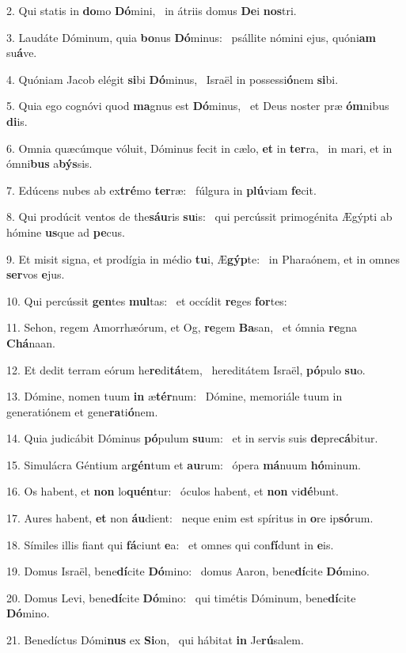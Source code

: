 2. Qui statis in \textbf{do}mo \textbf{Dó}mini, \ast\  in átriis domus \textbf{De}i \textbf{nos}tri.\

3. Laudáte Dóminum, quia \textbf{bo}nus \textbf{Dó}minus: \ast\  psállite nómini ejus, quóni\textbf{am} su\textbf{á}ve.\

4. Quóniam Jacob elégit \textbf{si}bi \textbf{Dó}minus, \ast\  Israël in possessi\textbf{ó}nem \textbf{si}bi.\

5. Quia ego cognóvi quod \textbf{ma}gnus est \textbf{Dó}minus, \ast\  et Deus noster præ \textbf{óm}nibus \textbf{di}is.\

6. Omnia quæcúmque vóluit, Dóminus fecit in cælo, \textbf{et} in \textbf{ter}ra, \ast\  in mari, et in ómni\textbf{bus} a\textbf{býs}sis.\

7. Edúcens nubes ab ex\textbf{tré}mo \textbf{ter}ræ: \ast\  fúlgura in \textbf{plú}viam \textbf{fe}cit.\

8. Qui prodúcit ventos de the\textbf{sáu}ris \textbf{su}is: \ast\  qui percússit primogénita Ægýpti ab hómine \textbf{us}que ad \textbf{pe}cus.\

9. Et misit signa, et prodígia in médio \textbf{tu}i, Æ\textbf{gýp}te: \ast\  in Pharaónem, et in omnes \textbf{ser}vos \textbf{e}jus.\

10. Qui percússit \textbf{gen}tes \textbf{mul}tas: \ast\  et occídit \textbf{re}ges \textbf{for}tes:\

11. Sehon, regem Amorrhæórum, et Og, \textbf{re}gem \textbf{Ba}san, \ast\  et ómnia \textbf{re}gna \textbf{Chá}naan.\

12. Et dedit terram eórum he\textbf{re}di\textbf{tá}tem, \ast\  hereditátem Israël, \textbf{pó}pulo \textbf{su}o.\

13. Dómine, nomen tuum \textbf{in} æ\textbf{tér}num: \ast\  Dómine, memoriále tuum in generatiónem et gene\textbf{ra}ti\textbf{ó}nem.\

14. Quia judicábit Dóminus \textbf{pó}pulum \textbf{su}um: \ast\  et in servis suis \textbf{de}pre\textbf{cá}bitur.\

15. Simulácra Géntium ar\textbf{gén}tum et \textbf{au}rum: \ast\  ópera \textbf{má}nuum \textbf{hó}minum.\

16. Os habent, et \textbf{non} lo\textbf{quén}tur: \ast\  óculos habent, et \textbf{non} vi\textbf{dé}bunt.\

17. Aures habent, \textbf{et} non \textbf{áu}dient: \ast\  neque enim est spíritus in \textbf{o}re ip\textbf{só}rum.\

18. Símiles illis fiant qui \textbf{fá}ciunt \textbf{e}a: \ast\  et omnes qui con\textbf{fí}dunt in \textbf{e}is.\

19. Domus Israël, bene\textbf{dí}cite \textbf{Dó}mino: \ast\  domus Aaron, bene\textbf{dí}cite \textbf{Dó}mino.\

20. Domus Levi, bene\textbf{dí}cite \textbf{Dó}mino: \ast\  qui timétis Dóminum, bene\textbf{dí}cite \textbf{Dó}mino.\

21. Benedíctus Dómi\textbf{nus} ex \textbf{Si}on, \ast\  qui hábitat \textbf{in} Je\textbf{rú}salem.\

